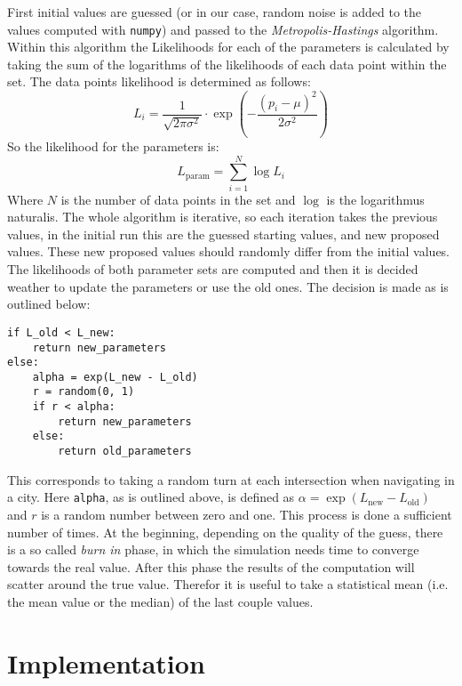 \documentclass{aa}
\begin{document}
First initial values are guessed (or in our case, random noise is added to the values computed
with \verb+numpy+) and passed to the \emph{Metropolis-Hastings} algorithm. Within this
algorithm the Likelihoods for each of the parameters is calculated by taking the sum of the
logarithms of the likelihoods of each data point within the set. The data points likelihood is
determined as follows:
\begin{equation}
    \label{eqn:data_likelihood}
    L_i = \frac{1}{\sqrt{2\pi\sigma^2}} \cdot \exp \left(- \frac{(p_i - \mu)^2}{2\sigma^2}
    \right)
\end{equation}
So the likelihood for the parameters is:
\begin{equation}
    \label{eqn:parameter_likelihood}
    L_\mathrm{param} = \sum\limits_{i=1}^N \log L_i
\end{equation}
Where \(N\) is the number of data points in the set and \(\log\) is the logarithmus naturalis.
The whole algorithm is iterative, so each iteration takes the previous values, in the initial
run this are the guessed starting values, and new proposed values. These new proposed values
should randomly differ from the initial values. The likelihoods of both parameter sets are
computed and then it is decided weather to update the parameters or use the old ones. The
decision is made as is outlined below:
\begin{lstlisting}[numbers=none]
if L_old < L_new:
    return new_parameters
else:
    alpha = exp(L_new - L_old)
    r = random(0, 1)
    if r < alpha:
        return new_parameters
    else:
        return old_parameters
\end{lstlisting}
This corresponds to taking a random turn at each intersection when navigating in a city. Here
\verb+alpha+, as is outlined above, is defined as \(\alpha = \exp(L_\mathrm{new} -
L_\mathrm{old})\) and \(r\) is a random number between zero and one. This process is done a
sufficient number of times. At the beginning, depending on the quality of the guess, there is a
so called \emph{burn in} phase, in which the simulation needs time to converge towards the real
value. After this phase the results of the computation will scatter around the true value.
Therefor it is useful to take a statistical mean (i.e. the mean value or the median) of the
last couple values.

\section{Implementation}%
\label{sec:implementation}
\end{document}
